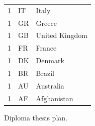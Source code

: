\documentclass[
  printed, %
  table,   %
  lof,     %
  lot,     %
           oneside, color
]{fithesis3}
\begin{document}
\begin{figure}[H]
\begin{tabular}{lll}
1                            & IT                         & Italy                 \\
1                            & GR                         & Greece                \\
1                            & GB                         & United Kingdom        \\
1                            & FR                         & France                \\
1                            & DK                         & Denmark               \\
1                            & BR                         & Brazil                \\
1                            & AU                         & Australia             \\
1                            & AF                         & Afghanistan           \\
\end{tabular}
\caption{Diploma thesis plan.}
\label{table:countriesminers}
\end{figure}


\label{monero-user-study-pdf}


\label{monero-miners-study-pdf}

%
%
\end{document}
